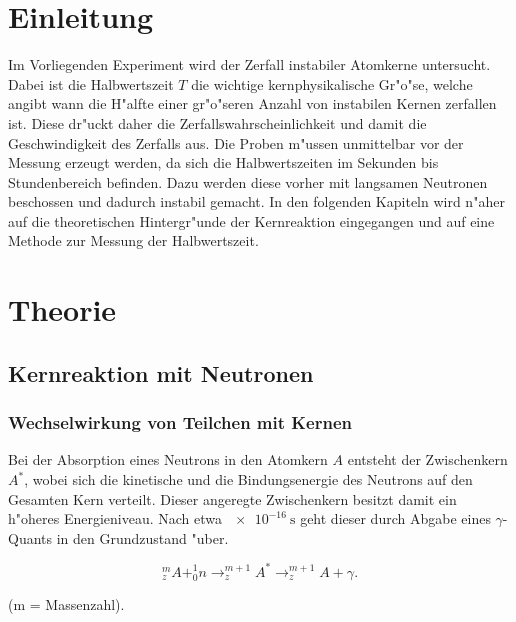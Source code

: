 \section{Einleitung}
	\label{sec:einleitung}

	Im Vorliegenden Experiment wird der Zerfall instabiler Atomkerne untersucht.
	Dabei ist die Halbwertszeit $T$ die wichtige kernphysikalische Gr"o"se, welche angibt wann die H"alfte einer gr"o"seren Anzahl von instabilen Kernen zerfallen ist.
	Diese dr"uckt daher die Zerfallswahrscheinlichkeit und damit die Geschwindigkeit des Zerfalls aus.
	Die Proben m"ussen unmittelbar vor der Messung erzeugt werden, da sich die Halbwertszeiten im Sekunden bis Stundenbereich befinden.
	Dazu werden diese vorher mit langsamen Neutronen beschossen und dadurch instabil gemacht.
	In den folgenden Kapiteln wird n"aher auf die theoretischen Hintergr"unde der Kernreaktion eingegangen und auf eine Methode zur Messung der Halbwertszeit.

\section{Theorie}
\label{sec:theorie}

	\subsection{Kernreaktion mit Neutronen}
	\label{sub:kernreaktion_mit_neutronen}

		\subsubsection{Wechselwirkung von Teilchen mit Kernen}
		\label{sub:wechselwirkung_von_teilchen_mit_kernen}
			
			Bei der Absorption eines Neutrons in den Atomkern $A$ entsteht der Zwischenkern $A^*$, wobei sich die kinetische und die Bindungsenergie des Neutrons auf den Gesamten Kern verteilt.
			Dieser angeregte Zwischenkern besitzt damit ein h"oheres Energieniveau.
			Nach etwa $\SI{e-16}{\second}$ geht dieser durch Abgabe eines $\gamma$-Quants in den Grundzustand "uber.

			\begin{equation*}
				^m_zA + ^1_0n \rightarrow ^{m+1}_zA^* \rightarrow ^{m+1}_zA + \gamma.
			\end{equation*}

			\begin{center}
				\tiny{(m = Massenzahl).}
			\end{center}

